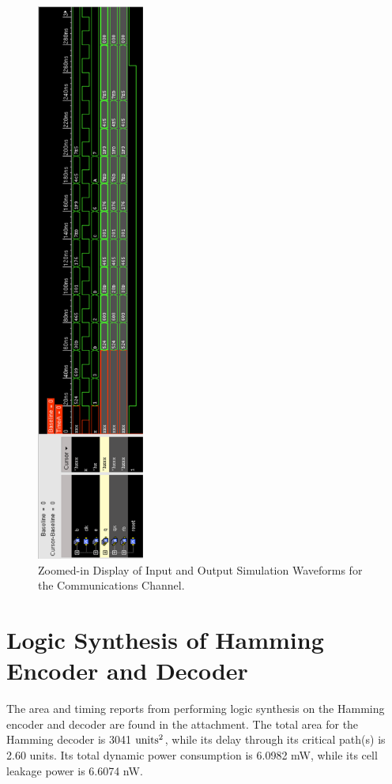 \documentclass[ee577b,acmnow]{acmtrans2m}
\begin{document}
\hspace{-2cm}\begin{figure}
\begin{center}
\includegraphics[height=18.5cm]{prefinal1}
\caption{Zoomed-in Display of Input and Output Simulation Waveforms for the Communications Channel.}
\label{pref1}
\end{center}
\end{figure}

\section{Logic Synthesis of Hamming Encoder and Decoder}

The area and timing reports from performing logic synthesis on
the Hamming encoder and decoder are found in the attachment. The
total area for the Hamming decoder is 3041 ${\rm units^2}$, while
its delay through its critical path(s) is 2.60 units. Its total
dynamic power consumption is 6.0982 mW, while its cell leakage
power is 6.6074 nW.
\end{document}
